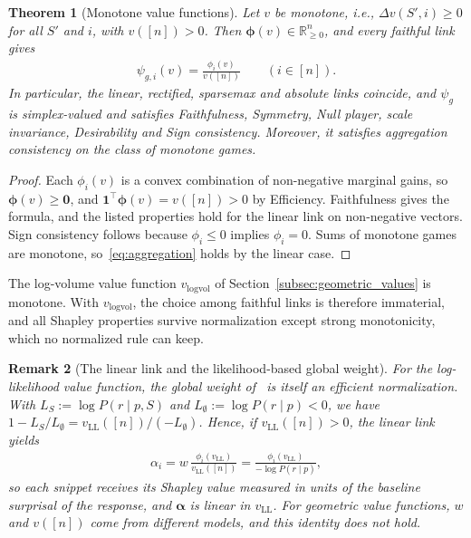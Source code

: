 \documentclass{article}
\newtheorem{theorem}{Theorem}
\newtheorem{remark}[theorem]{Remark}
\begin{document}
\begin{theorem}[Monotone value functions]\label{thm:monotone_links}
Let $v$ be monotone, i.e., $\Delta v(S', i) \ge 0$ for all $S'$ and $i$, with $v([n]) > 0$. Then $\boldsymbol{\phi}(v) \in \mathbb{R}^n_{\ge 0}$, and every faithful link gives
\begin{align}
    \psi_{g,i}(v) = \frac{\phi_i(v)}{v([n])} \qquad (i \in [n]).
\end{align}
In particular, the linear, rectified, sparsemax and absolute links coincide, and $\psi_g$ is simplex-valued and satisfies Faithfulness, Symmetry, Null player, scale invariance, Desirability and Sign consistency. Moreover, it satisfies aggregation consistency on the class of monotone games.
\end{theorem}

\begin{proof}
Each $\phi_i(v)$ is a convex combination of non-negative marginal gains, so $\boldsymbol{\phi}(v) \ge \mathbf{0}$, and $\mathbf{1}^\top \boldsymbol{\phi}(v) = v([n]) > 0$ by Efficiency. Faithfulness gives the formula, and the listed properties hold for the linear link on non-negative vectors. Sign consistency follows because $\phi_i \le 0$ implies $\phi_i = 0$. Sums of monotone games are monotone, so~\eqref{eq:aggregation} holds by the linear case.
\end{proof}

The log-volume value function $v_{\text{logvol}}$ of Section~\ref{subsec:geometric_values} is monotone. With $v_{\text{logvol}}$, the choice among faithful links is therefore immaterial, and all Shapley properties survive normalization except strong monotonicity, which no normalized rule can keep.

\begin{remark}[The linear link and the likelihood-based global weight]\label{rem:linear_llh}
For the log-likelihood value function, the global weight of~\cite{nematov2025source} is itself an efficient normalization. With $L_S := \log P(r \mid p, S)$ and $L_\emptyset := \log P(r \mid p) < 0$, we have $1 - L_S / L_\emptyset = v_{\text{LL}}([n]) / (-L_\emptyset)$. Hence, if $v_{\text{LL}}([n]) > 0$, the linear link yields
\begin{align}
    \alpha_i = w \, \frac{\phi_i(v_{\text{LL}})}{v_{\text{LL}}([n])} = \frac{\phi_i(v_{\text{LL}})}{-\log P(r \mid p)},
\end{align}
so each snippet receives its Shapley value measured in units of the baseline surprisal of the response, and $\boldsymbol{\alpha}$ is linear in $v_{\text{LL}}$. For geometric value functions, $w$ and $v([n])$ come from different models, and this identity does not hold.
\end{remark}
\end{document}
